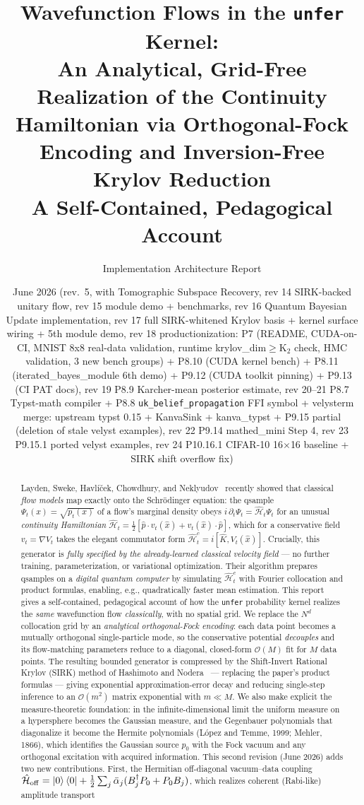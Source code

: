 \documentclass[11pt, a4paper]{article}
\title{\textbf{Wavefunction Flows in the \texttt{unfer} Kernel:\\
An Analytical, Grid-Free Realization of the Continuity Hamiltonian
via Orthogonal-Fock Encoding and Inversion-Free Krylov Reduction}\\[4pt]
\large A Self-Contained, Pedagogical Account}
\author{Implementation Architecture Report}
\date{June 2026 (rev.\ 5, with Tomographic Subspace Recovery, rev 14 SIRK-backed unitary flow, rev 15 module demo + benchmarks, rev 16 Quantum Bayesian Update implementation, rev 17 full SIRK-whitened Krylov basis + kernel surface wiring + 5th module demo, rev 18 productionization: P7 (README, CUDA-on-CI, MNIST 8x8 real-data validation, runtime krylov_dim$\ge$K$_2$ check, HMC validation, 3 new bench groups) + P8.10 (CUDA kernel bench) + P8.11 (iterated\_bayes\_module 6th demo) + P9.12 (CUDA toolkit pinning) + P9.13 (CI PAT docs), rev 19 P8.9 Karcher-mean posterior estimate, rev 20--21 P8.7 Typst-math compiler + P8.8 \texttt{uk\_belief\_propagation} FFI symbol + velysterm merge: upstream typst 0.15 + KanvaSink + kanva\_typst + P9.15 partial (deletion of stale velyst examples), rev 22 P9.14 mathed\_mini Step 4, rev 23 P9.15.1 ported velyst examples, rev 24 P10.16.1 CIFAR-10 16$\times$16 baseline + SIRK shift overflow fix)}
\newcommand{\Hgen}{\hat{\mathcal{H}}}
\newcommand{\Kop}{\hat{K}}
\begin{document}
\maketitle

\begin{abstract}
Layden, Sweke, Havl\'i\v{c}ek, Chowdhury, and Neklyudov~\cite{Layden2025}
recently showed that classical \emph{flow models} map exactly onto the
Schr\"odinger equation: the qsample $\Psi_t(x)=\sqrt{p_t(x)}$ of a flow's
marginal density obeys $i\,\partial_t\Psi_t=\Hgen_t\Psi_t$ for an unusual
\emph{continuity Hamiltonian} $\Hgen_t=\tfrac12[\hat p\cdot v_t(\hat x)+
v_t(\hat x)\cdot\hat p]$, which for a conservative field $v_t=\nabla V_t$
takes the elegant commutator form $\Hgen_t^c=i[\Kop,V_t(\hat x)]$. Crucially,
this generator is \emph{fully specified by the already-learned classical
velocity field} --- no further training, parameterization, or variational
optimization. Their algorithm prepares qsamples on a \emph{digital quantum
computer} by simulating $\Hgen_t^c$ with Fourier collocation and product
formulas, enabling, e.g., quadratically faster mean estimation. This report
gives a self-contained, pedagogical account of how the \texttt{unfer}
probability kernel realizes the \emph{same} wavefunction flow
\emph{classically}, with no spatial grid. We replace the $N^d$ collocation
grid by an \emph{analytical orthogonal-Fock encoding}: each data point becomes
a mutually orthogonal single-particle mode, so the conservative potential
\emph{decouples} and its flow-matching parameters reduce to a diagonal,
closed-form $\mathcal{O}(M)$ fit for $M$ data points. The resulting bounded
generator is compressed by the Shift-Invert Rational Krylov (SIRK) method of
Hashimoto and Nodera~\cite{Hashimoto2019} --- replacing the paper's product
formulas --- giving exponential approximation-error decay and reducing
single-step inference to an $\mathcal{O}(m^2)$ matrix exponential with
$m\ll M$. We also make explicit the measure-theoretic foundation: in the
infinite-dimensional limit the uniform measure on a hypersphere becomes the
Gaussian measure, and the Gegenbauer polynomials that diagonalize it become
the Hermite polynomials (L\'opez and Temme, 1999; Mehler, 1866), which
identifies the Gaussian source $p_0$ with the Fock vacuum and any orthogonal
excitation with acquired information. This second revision (June 2026) adds
two new contributions. First, the Hermitian off-diagonal vacuum--data coupling
$\Hgen_{\mathrm{off}}=\ket{0}\bra{0}+\tfrac12\sum_j\bar\alpha_j(B_j^\dagger
P_0+P_0 B_j)$, which realizes coherent (Rabi-like) amplitude transport

\end{abstract}
\end{document}
